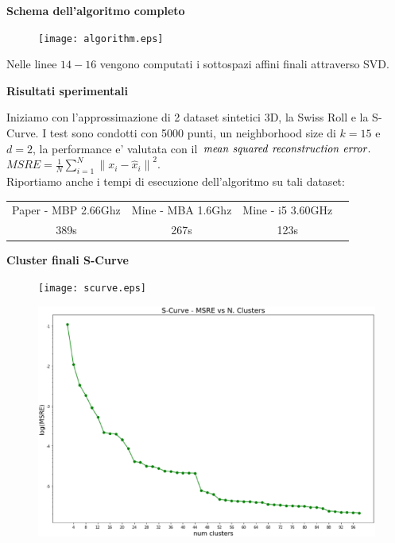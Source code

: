 \documentclass[a4, landscape]{seminar}
\theoremstyle{definition}
\def\bc{\begin{center}}
\def\ec{\end{center}}
\def\bs{\begin{slide}\begingroup\small}
\def\es{\endgroup\end{slide}}
\begin{document}
\bs
\bc{\bf\color{blue}Schema dell'algoritmo completo}\ec
\begin{figure}[b]
\centering
\texttt{[image: algorithm.eps]}
\end{figure}
Nelle linee $14-16$ vengono computati i sottospazi affini finali attraverso SVD.
\es

\bs
\bc{\bf\color{blue}Risultati sperimentali}\ec
Iniziamo con l'approssimazione di 2 dataset sintetici 3D, la Swiss Roll e la S-Curve. I test sono condotti con 5000 punti,
un neighborhood size di $k=15$ e $d=2$, la performance e' valutata con il $\it{mean\ squared\ reconstruction\ error.}$
$M S R E=\frac{1}{N} \sum_{i=1}^{N}\left\|x_{i}-\hat{x}_{i}\right\|^{2}$. \\
Riportiamo anche i tempi di esecuzione dell'algoritmo su tali dataset:
\begin{center}
    \begin{tabular}{ |c|c|c|c| }
    \hline
    Paper - MBP 2.66Ghz & Mine - MBA 1.6Ghz & Mine - i5 3.60GHz \\
    389s & \color[HTML]{009901} 267s & \color[HTML]{009901} 123s \\
    \hline
    \end{tabular}
\end{center}
\es

\bs
\bc{\bf\color{blue}Cluster finali S-Curve}\ec
\begin{figure}[b]
\centering
\texttt{[image: scurve.eps]}
\end{figure}
\es

\bs
\begin{figure}[b]
\centering
\includegraphics[width=\textwidth]{scurve_msre.eps}
\end{figure}
\es
\end{document}
